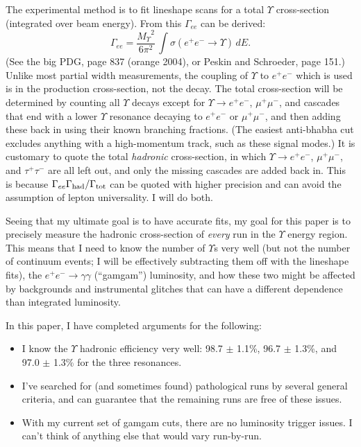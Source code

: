 \documentclass[12pt]{article}
\begin{document}
The experimental method is to fit lineshape scans for a total
$\Upsilon$ cross-section (integrated over beam energy).  From this
$\Gamma_{ee}$ can be derived:
\begin{equation}
  \Gamma_{ee} = \frac{{M_\Upsilon}^2}{6\pi^2} \, \int \sigma(e^+e^-
  \to \Upsilon) \, dE \mbox{.}
\end{equation}
(See the big PDG, page 837 (orange 2004), or Peskin and Schroeder,
page 151.)  Unlike most partial width measurements, the coupling of
$\Upsilon$ to $e^+e^-$ which is used is in the production
cross-section, not the decay.  The total cross-section will be
determined by counting all $\Upsilon$ decays except for $\Upsilon \to
e^+e^-$, $\mu^+\mu^-$, and cascades that end with a lower $\Upsilon$
resonance decaying to $e^+e^-$ or $\mu^+\mu^-$, and then adding these
back in using their known branching fractions.  (The easiest
anti-bhabha cut excludes anything with a high-momentum track,
such as these signal modes.)  It is customary to quote the total
{\it hadronic} cross-section, in which $\Upsilon \to e^+e^-$,
$\mu^+\mu^-$, and $\tau^+\tau^-$ are all left out, and only the
missing cascades are added back in.  This is because
$\Gamma_{ee}\Gamma_{\mbox{\scriptsize had}}/\Gamma_{\mbox{\scriptsize tot}}$ can be quoted with
higher precision and can avoid the assumption of lepton universality.
I will do both.

Seeing that my ultimate goal is to have accurate fits, my goal for
this paper is to precisely measure the hadronic cross-section of {\it
every} run in the $\Upsilon$ energy region.  This means that I need to
know the number of $\Upsilon$s very well (but not the number of
continuum events; I will be effectively subtracting them off with the
lineshape fits), the $e^+e^- \to \gamma\gamma$ (``gamgam'')
luminosity, and how these two might be affected by backgrounds and
instrumental glitches that can have a different dependence than
integrated luminosity.

In this paper, I have completed arguments for the following:
\begin{itemize}

  \item I know the $\Upsilon$ hadronic efficiency very well: 98.7
    $\pm$ 1.1\%, 96.7 $\pm$ 1.3\%, and 97.0 $\pm$ 1.3\% for the three
    resonances.

  \item I've searched for (and sometimes found) pathological runs by
    several general criteria, and can guarantee that the remaining
    runs are free of these issues.

  \item With my current set of gamgam cuts, there are no luminosity
    trigger issues.  I can't think of anything else that would vary
    run-by-run.

\end{itemize}
\end{document}
